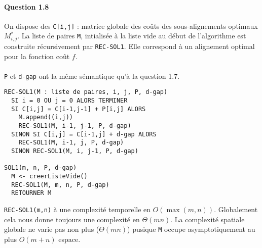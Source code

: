 \paragraph{Question 1.8}
On dispose des \verb'C[i,j]' : matrice globale des co\^uts des sous-alignements
optimaux $M_{i,j}^*$.
La liste de paires \verb'M', intialis\'ee \`a la liste vide au d\'ebut
de l'algorithme est construite r\'ecursivement par
\verb'REC-SOL1'. Elle correspond \`a un alignement optimal pour la
fonction co\^ut $f$.\\\\
\verb'P' et \verb'd-gap' ont la m\^eme s\'emantique qu'\`a la question
1.7.
\begin{verbatim}
REC-SOL1(M : liste de paires, i, j, P, d-gap)
  SI i = 0 OU j = 0 ALORS TERMINER
  SI C[i,j] = C[i-1,j-1] + P[i,j] ALORS
    M.append((i,j))
    REC-SOL1(M, i-1, j-1, P, d-gap)
  SINON SI C[i,j] = C[i-1,j] + d-gap ALORS
    REC-SOL1(M, i-1, j, P, d-gap)
  SINON REC-SOL1(M, i, j-1, P, d-gap)

SOL1(m, n, P, d-gap)
  M <- creerListeVide()
  REC-SOL1(M, m, n, P, d-gap)
  RETOURNER M
\end{verbatim}
\verb'REC-SOL1(m,n)' \`a une complexit\'e temporelle en
$O(\max(m,n))$. Globalement cela nous donne toujours une complexit\'e
en $\Theta(mn)$. La complexit\'e spatiale globale ne varie pas non
plus ($\Theta(mn)$) pusique \verb'M' occupe asymptotiquement au plus
$O(m+n)$ espace.
